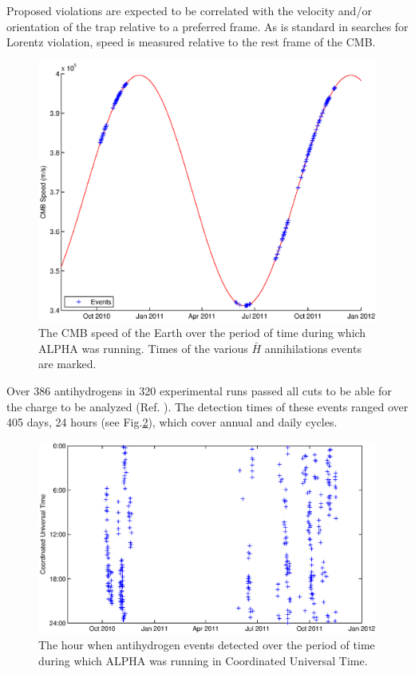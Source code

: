 \documentclass[superscriptaddress,aps,prb,11pt]{revtex4-1}
\begin{document}
Proposed violations are expected to be correlated with the velocity and/or orientation of the trap relative to a preferred frame.  As is standard in searches for Lorentz violation, speed is measured relative to the rest frame of the CMB.

\begin{figure}
  \includegraphics[scale=0.3]{True_Event_Distribution.eps}
  \caption{The CMB speed of the Earth over the period of time during which ALPHA was running.  Times of the various $\bar{H}$ annihilations events are marked.}
  \label{fig:true_event_distribution}
\end{figure}

Over 386 antihydrogens in 320 experimental runs passed all cuts to be able for the charge to be analyzed (Ref. ). The detection times of these events ranged over 405 days, 24 hours (see Fig.\ref{fig:eventTime_date_experiment}), which cover annual and daily cycles.

\begin{figure}
  \includegraphics[scale=0.6]{eventTime_date_experiment.eps}
  \caption{The hour when antihydrogen events detected over the period of time during which ALPHA was running in Coordinated Universal Time.}
  \label{fig:eventTime_date_experiment}
\end{figure}
\end{document}
